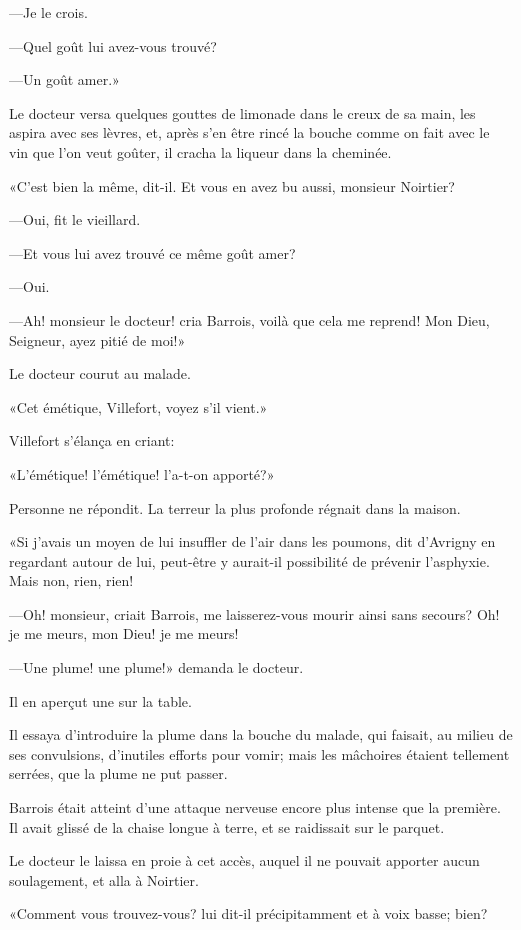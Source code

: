—Je le crois. 

—Quel goût lui avez-vous trouvé? 

—Un goût amer.» 

Le docteur versa quelques gouttes de limonade dans le creux de sa main, les aspira avec ses lèvres, et, après s'en être rincé la bouche comme on fait avec le vin que l'on veut goûter, il cracha la liqueur dans la cheminée. 

«C'est bien la même, dit-il. Et vous en avez bu aussi, monsieur Noirtier? 

—Oui, fit le vieillard. 

—Et vous lui avez trouvé ce même goût amer? 

—Oui. 

—Ah! monsieur le docteur! cria Barrois, voilà que cela me reprend! Mon Dieu, Seigneur, ayez pitié de moi!» 

Le docteur courut au malade. 

«Cet émétique, Villefort, voyez s'il vient.» 

Villefort s'élança en criant: 

«L'émétique! l'émétique! l'a-t-on apporté?» 

Personne ne répondit. La terreur la plus profonde régnait dans la maison. 

«Si j'avais un moyen de lui insuffler de l'air dans les poumons, dit d'Avrigny en regardant autour de lui, peut-être y aurait-il possibilité de prévenir l'asphyxie. Mais non, rien, rien! 

—Oh! monsieur, criait Barrois, me laisserez-vous mourir ainsi sans secours? Oh! je me meurs, mon Dieu! je me meurs! 

—Une plume! une plume!» demanda le docteur. 

Il en aperçut une sur la table. 

Il essaya d'introduire la plume dans la bouche du malade, qui faisait, au milieu de ses convulsions, d'inutiles efforts pour vomir; mais les mâchoires étaient tellement serrées, que la plume ne put passer. 

Barrois était atteint d'une attaque nerveuse encore plus intense que la première. Il avait glissé de la chaise longue à terre, et se raidissait sur le parquet. 

Le docteur le laissa en proie à cet accès, auquel il ne pouvait apporter aucun soulagement, et alla à Noirtier. 

«Comment vous trouvez-vous? lui dit-il précipitamment et à voix basse; bien? 

